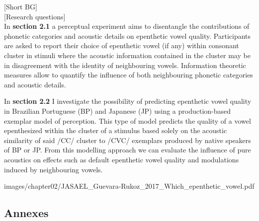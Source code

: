 


[Short BG] \\


[Research questions] \\


In \textbf{section 2.1} a perceptual experiment aims to disentangle the contributions of phonetic categories and acoustic details on epenthetic vowel quality. Participants are asked to report their choice of epenthetic vowel (if any) within consonant cluster in stimuli where the acoustic information contained in the cluster may be in disagreement with the identity of neighbouring vowels. Information theoretic measures allow to quantify the influence of both neighbouring phonetic categories and acoustic details.  


In \textbf{section 2.2} I investigate the possibility of predicting epenthetic vowel quality in Brazilian Portuguese (BP) and Japanese (JP) using a production-based exemplar model of perception. This type of model predicts the quality of a vowel epenthesized within the cluster of a stimulus based solely on the acoustic similarity of said /CC/ cluster to /CVC/ exemplars produced by native speakers of BP or JP. From this modelling approach we can evaluate the influence of pure acoustics on effects such as default epenthetic vowel quality and modulations induced by neighbouring vowels.



{images/chapter02/JASAEL_Guevara-Rukoz_2017_Which_epenthetic_vowel.pdf}

\subsection{Annexes}

